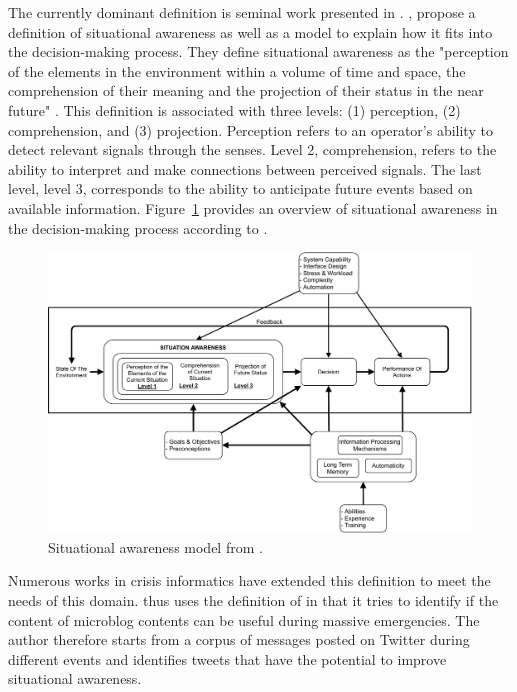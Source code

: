 The currently dominant definition is seminal work presented in \parencite{endsleyTheorySituationAwareness1995}.
\citeauthor{endsleyTheorySituationAwareness1995}, propose a definition of situational awareness as well as a model to explain how it fits into the decision-making process.
They define situational awareness as the "perception of the elements in the environment within a volume of time and space, the comprehension of their meaning and the projection of their status in the near future" \parencite[p. 36]{kropczynskiIdentifyingActionableInformation2018}.
This definition is associated with three levels: (1) perception, (2) comprehension, and (3) projection.
Perception refers to an operator's ability to detect relevant signals through the senses.
Level 2, comprehension, refers to the ability to interpret and make connections between perceived signals.
The last level, level 3, corresponds to the ability to anticipate future events based on available information.
Figure~\ref{information:SA} provides an overview of situational awareness in the decision-making process according to \parencite{endsleyTheorySituationAwareness1995}.

\begin{figure}[htb]
    \centering
    \includegraphics[width=\textwidth]{figures/chap-3/Endsley-1995.pdf}
    \caption{Situational awareness model from \textcite{endsleyTheorySituationAwareness1995}.}
    \label{information:SA}
\end{figure}

Numerous works in crisis informatics have extended this definition to meet the needs of this domain.
\textcite{viewegSituationalAwarenessMass2012} thus uses the definition of \textcite{endsleyTheorySituationAwareness1995} in that it tries to identify if the content of microblog contents can be useful during massive emergencies.
The author therefore starts from a corpus of messages posted on Twitter during different events and identifies tweets that have the potential to improve situational awareness.

